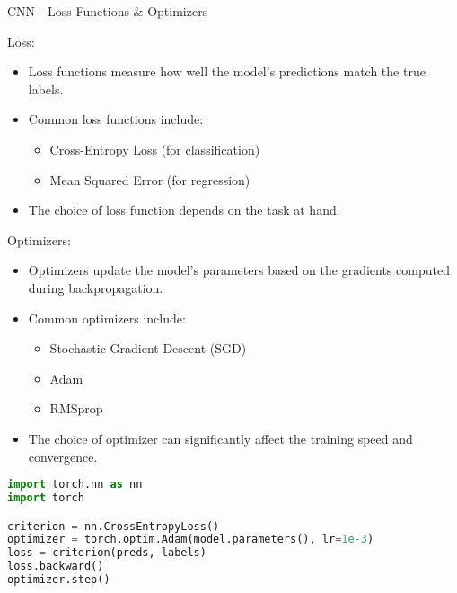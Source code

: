 \begin{frame}{CNN - Loss Functions & Optimizers}
\begin{block}{Loss:}
    \begin{itemize}
        \item Loss functions measure how well the model's predictions match the true labels.
        \item Common loss functions include:
            \begin{itemize}
                \item Cross-Entropy Loss (for classification)
                \item Mean Squared Error (for regression)
            \end{itemize}
        \item The choice of loss function depends on the task at hand.
    \end{itemize}
\end{block}

\begin{block}{Optimizers:}
    \begin{itemize}
        \item Optimizers update the model's parameters based on the gradients computed during backpropagation.
        \item Common optimizers include:
            \begin{itemize}
                \item Stochastic Gradient Descent (SGD)
                \item Adam
                \item RMSprop
            \end{itemize}
        \item The choice of optimizer can significantly affect the training speed and convergence.
    \end{itemize}
\end{block}

\begin{lstlisting}[language=Python, caption={Code snippet (PyTorch)}, basicstyle=\ttfamily\footnotesize]
import torch.nn as nn
import torch

criterion = nn.CrossEntropyLoss()
optimizer = torch.optim.Adam(model.parameters(), lr=1e-3)
loss = criterion(preds, labels)
loss.backward()
optimizer.step()
\end{lstlisting}
\end{frame}  